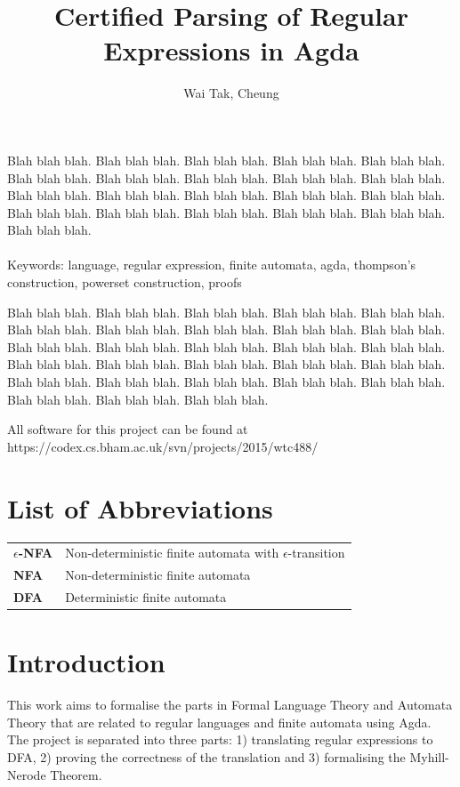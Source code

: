 \documentclass[twoside,openright,final]{bhamthesis}
\title{Certified Parsing of Regular Expressions in Agda}
\author{Wai Tak, Cheung}
\begin{document}
\maketitle

\abstract
\par Blah blah blah. Blah blah blah. Blah blah blah. Blah blah blah. Blah
blah blah. Blah blah blah. Blah blah blah. Blah blah blah.
Blah blah blah. Blah blah blah. Blah blah blah. Blah blah blah. Blah
blah blah.
Blah blah blah. Blah blah blah. Blah blah blah. Blah blah blah.
Blah blah blah. Blah blah blah. Blah blah blah. Blah blah blah. \\ \\
Keywords: language, regular expression, finite automata, agda,
thompson's construction, powerset construction, proofs

\acknowledgments
\par Blah blah blah. Blah blah blah. Blah blah blah. Blah blah blah. Blah
blah blah. Blah blah blah. Blah blah blah.
Blah blah blah. Blah blah blah. Blah blah blah.
Blah blah blah. Blah blah blah. Blah blah blah. Blah blah blah. Blah
blah blah. Blah blah blah. Blah blah blah.
Blah blah blah. Blah blah blah. Blah blah blah. Blah blah blah. Blah
blah blah. Blah blah blah.
Blah blah blah. Blah blah blah. Blah blah blah. Blah blah blah. Blah
blah blah.

\repository
\vspace{7cm}
\begin{center}
  All software for this project can be found at \\
  https://codex.cs.bham.ac.uk/svn/projects/2015/wtc488/
\end{center}

\newpage
\tableofcontents
\newpage

\section{List of Abbreviations}
\begin{tabular}{ll}
  \textbf{\(\epsilon\)-NFA} & Non-deterministic finite automata with
                              \(\epsilon\)-transition \\
  \textbf{NFA} & Non-deterministic finite automata \\
  \textbf{DFA} & Deterministic finite automata 
\end{tabular}

\section{Introduction}
This work aims to formalise the parts in Formal Language Theory and
Automata Theory that are related to regular languages and finite automata
using Agda. The project is separated into three parts: 1) translating
regular expressions to DFA, 2) proving the correctness of
the translation and 3) formalising the Myhill-Nerode Theorem. 
\end{document}
